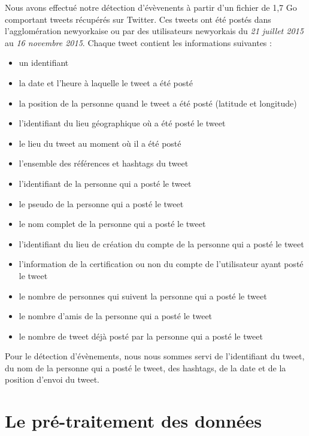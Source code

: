 \documentclass[12pt]{article}
\begin{document}
Nous avons effectu\'e notre d\'etection d'\'ev\`evenents \`a partir d'un fichier de 1,7 Go comportant  tweets  r\'ecup\'er\'es sur Twitter. Ces tweets ont \'et\'e post\'es dans l'agglom\'eration newyorkaise ou par des utilisateurs newyorkais du \textit{21 juillet 2015} au \textit{16 novembre 2015}. Chaque tweet contient les informations suivantes :

\begin{itemize}
	\item un identifiant
	\item la date et l'heure \`a laquelle le tweet a \'et\'e post\'e
	\item la position de la personne quand le tweet a \'et\'e post\'e (latitude et longitude)
	\item l'identifiant du lieu g\'eographique o\`u a \'et\'e post\'e le tweet
	\item le lieu du tweet au moment o\`u il a \'et\'e post\'e
	\item l'ensemble des r\'ef\'erences et hashtags du tweet
	\item l'identifiant de la personne qui a post\'e le tweet
	\item le pseudo de la personne qui a post\'e le tweet
	\item le nom complet de la personne qui a post\'e le tweet
	\item l'identifiant du lieu de cr\'eation du compte de la personne qui a post\'e le tweet
	\item l'information de la certification ou non du compte de l'utilisateur ayant post\'e le tweet
	\item le nombre de personnes qui suivent la personne qui a post\'e le tweet
	\item le nombre d'amis de la personne qui a post\'e le tweet
	\item le nombre de tweet d\'ej\`a post\'e par la personne qui a post\'e le tweet
\end{itemize}

Pour le d\'etection d'\'ev\`enements, nous nous sommes servi de l'identifiant du tweet, du nom de la personne qui a post\'e le
tweet, des hashtags, de la date et de la position d'envoi du tweet.

\vfill

\section{Le pr\'e-traitement des donn\'ees}
\end{document}
